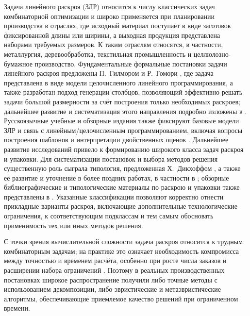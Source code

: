 Задача линейного раскроя (ЗЛР) относится к числу классических задач комбинаторной оптимизации и широко применяется при планировании производства в отраслях, где исходный материал поступает в виде заготовок фиксированной длины или ширины, а выходная продукция представлена наборами требуемых размеров.
К таким отраслям относятся, в частности, металлургия, деревообработка, текстильная промышленность и целлюлозно-бумажное производство.
Фундаментальные формальные постановки задачи линейного раскроя предложены П.~Гилмором и Р.~Гомори \cite{gilmore1961linear, gilmore1963linear}, где задача представлена в виде модели целочисленного линейного программирования, а также разработан подход генерации столбцов, позволяющий эффективно решать задачи большой размерности за счёт построения только необходимых раскроев; дальнейшее развитие и систематизация этого направления подробно изложены в \cite{desaulniers2005_column_generation, scheithauer2017_cutpack_optimization, goulimis1990_cutstock_optimal}.
Русскоязычные учебные и обзорные издания также фиксируют базовые модели ЗЛР и связь с линейным/целочисленным программированием, включая вопросы построения шаблонов и интерпретации двойственных оценок \cite{агишева2010линейное,зенков2017методы, dantzig1963_lp_extensions, bazaraa2011_lp_network, hillier2021_intro_or, ahuja1993_network_flows}.
Дальнейшее развитие исследований привело к формированию широкого класса задач раскроя и упаковки.
Для систематизации постановок и выбора методов решения существенную роль сыграла типология, предложенная Х.~Дикхоффом \cite{dyckhoff1990typology}, а также её развитие и уточнение в более поздних работах, в частности в \cite{wascher2007typology}; обзорные библиографические и типологические материалы по раскрою и упаковки также представлены в \cite{dyckhoff1992_typology_biblio, sweeney1991_cutpack_review}.
Указанные классификации позволяют корректно отнести прикладные варианты раскроя, включающие дополнительные технологические ограничения, к соответствующим подклассам и тем самым обосновать применимость тех или иных методов решения.

С точки зрения вычислительной сложности задача раскроя относится к трудным комбинаторным задачам; на практике это означает необходимость компромисса между точностью и временем расчёта, особенно при росте числа заказов и расширении набора ограничений \cite{garey1979computers, papadimitriou1998_combinatorial_opt}.
Поэтому в реальных производственных постановках широкое распространение получили либо точные методы с использованием декомпозиции, либо эвристические и метаэвристические алгоритмы, обеспечивающие приемлемое качество решений при ограниченном времени.

